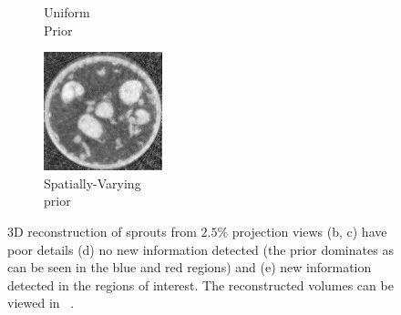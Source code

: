 \documentclass[journal]{IEEEtran}
\begin{document}
\begin{figure}[!h]
\begin{subfigure}[b]{0.3\linewidth}
        \caption{Uniform\\ Prior}
     \end{subfigure}
\quad
    \begin{subfigure}[b]{0.3\linewidth}
        \includegraphics[width=\textwidth]{../images/sprouts/weightedPriorIm.png}
        \caption{Spatially-Varying\\ prior}
    \end{subfigure}
     \caption{3D reconstruction of sprouts from $2.5\%$ projection views
   (b, c) have poor details (d) no new information detected (the
   prior dominates as can be seen in the blue and red regions) and
   (e) new information detected in the regions of interest. The reconstructed volumes can be viewed in ~\cite{supp_paper}.} 
\label{fig:sprouts_3D_results}
\end{figure}

\end{document}
